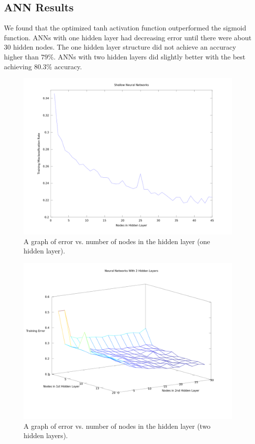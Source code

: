 \documentclass[12pt]{article}
\begin{document}
\subsection{ANN Results}
We found that the optimized tanh activation function outperformed the sigmoid function.  ANNs with one hidden layer had decreasing error until there were about 30 hidden nodes.  The one hidden layer structure did not achieve an accuracy higher than $79\%$. ANNs with two hidden layers did slightly better with the best achieving $80.3\%$ accuracy.
\\
\begin{figure}[H]
\includegraphics[width=\linewidth]{images/shallow.png}
\caption{A graph of error vs. number of nodes in the hidden layer (one hidden layer).}
\end{figure}

\begin{figure}[H]
\includegraphics[width=\linewidth]{images/deep4.png}
\caption{A graph of error vs. number of nodes in the hidden layer (two hidden layers).}
\end{figure}
\end{document}
